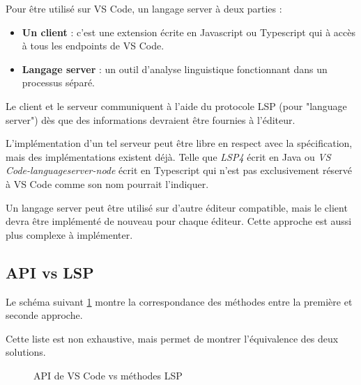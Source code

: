 \documentclass[
    iict, %
    il, %
]{heig-tb}
\begin{document}
Pour être utilisé sur VS Code, un langage server à deux parties :
\begin{itemize}
    \item \textbf{Un client} : c'est une extension écrite en Javascript ou Typescript qui à accès à tous les endpoints de VS Code.
    \item \textbf{Langage server} : un outil d'analyse linguistique fonctionnant dans un processus séparé.
\end{itemize}

\vspace{\parskip}

Le client et le serveur communiquent à l'aide du protocole LSP (pour "language server") dès que des informations devraient être fournies à l'éditeur.

L'implémentation d'un tel serveur peut être libre en respect avec la spécification, mais des implémentations existent déjà. Telle que \emph{LSP4} écrit en Java ou \emph{VS Code-languageserver-node}
écrit en Typescript qui n'est pas exclusivement réservé à VS Code comme son nom pourrait l'indiquer.

Un langage server peut être utilisé sur d'autre éditeur compatible, mais le client devra être implémenté de nouveau pour chaque éditeur.
Cette approche est aussi plus complexe à implémenter.

\subsection{API vs LSP}\label{api vs lsp}

Le schéma suivant \ref{API de VS Code vs méthodes LSP} montre la correspondance des méthodes entre la première et seconde approche.

Cette liste est non exhaustive, mais permet de montrer l'équivalence des deux solutions.

\begin{figure}[!ht]
    \begin{center}
    \end{center}
    \caption[API de VS Code vs méthodes LSP]{\label{API de VS Code vs méthodes LSP} API de VS Code vs méthodes LSP}
\end{figure}
\end{document}
